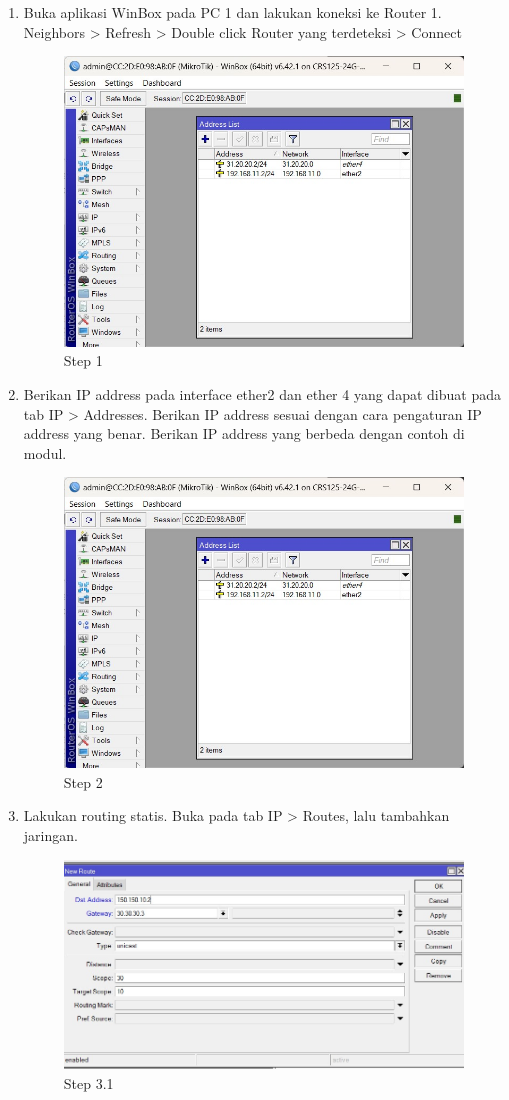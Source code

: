 \begin{enumerate}
	\item Buka aplikasi WinBox pada PC 1 dan lakukan koneksi ke Router 1. Neighbors > Refresh >
	Double click Router yang terdeteksi > Connect
	\begin{figure}[H]
		\centering
		\includegraphics[width=0.5\linewidth]{P2/img/statis_R1step1.jpg}
		\caption{Step 1}
		\label{fig:gambar1}
	\end{figure}

	\item Berikan IP address pada interface ether2 dan ether 4 yang dapat dibuat pada tab IP > Addresses. Berikan IP address sesuai dengan cara pengaturan IP address yang benar. Berikan IP
	address yang berbeda dengan contoh di modul.
	\begin{figure}[H]
		\centering
		\includegraphics[width=0.5\linewidth]{P2/img/statis_R1step1.jpg}
		\caption{Step 2}
		\label{fig:gambar2}
	\end{figure}

	\item Lakukan routing statis. Buka pada tab IP > Routes, lalu tambahkan jaringan.
	\begin{figure}[H]
		\centering
		\includegraphics[width=0.5\linewidth]{P2/img/statis_R1step3.jpg}
		\caption{Step 3.1}
		\label{fig:gambar3}
	\end{figure}


\end{enumerate}
